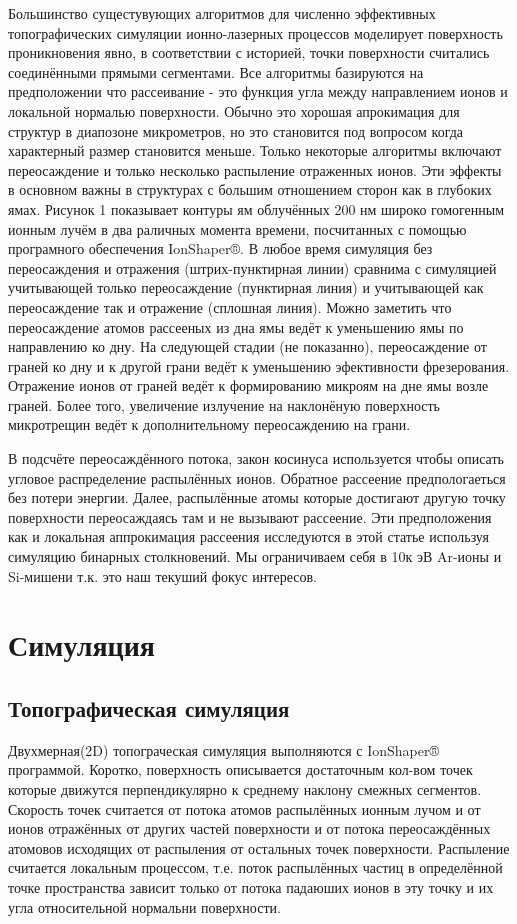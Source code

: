 \documentclass[a4paper,fontsize=12pt]{article}
\begin{document}
Большинство сущестувующих алгоритмов для численно эффективных топографических симуляции ионно-лазерных процессов моделирует поверхность проникновения явно, в соответствии с историей, точки поверхности считались соединёнными прямыми сегментами. Все алгоритмы базируются на предположении что рассеивание - это функция угла между направлением ионов и локальной нормалью поверхности. Обычно это хорошая апрокимация для структур в диапозоне микрометров, но это становится под вопросом когда характерный размер становится меньше. Только некоторые алгоритмы включают переосаждение и только несколько распыление отраженных ионов. Эти эффекты в основном важны в структурах с большим отношением сторон как в глубоких ямах. Рисунок 1 показывает контуры ям облучённых 200 нм широко гомогенным ионным лучём в два раличных момента времени, посчитанных с помощью програмного обеспечения IonShaper®. В любое время симуляция без переосаждения и отражения (штрих-пунктирная линии) сравнима с симуляцией учитывающей только переосаждение (пунктирная линия) и учитывающей как переосаждение так и отражение (сплошная линия). Можно заметить что переосаждение атомов рассееных из дна ямы ведёт к уменьшению ямы по направлению ко дну. На следующей стадии (не показанно), переосаждение от граней ко дну и к другой грани ведёт к уменьшению эфективности фрезерования. Отражение ионов от граней ведёт к формированию микроям на дне ямы возле граней. Более того, увеличение излучение на наклонёную поверхность микротрещин ведёт к дополнительному переосаждению на грани.

В подсчёте переосаждённого потока, закон косинуса используется чтобы описать угловое распределение распылённых ионов. Обратное рассеение предпологаеться без потери энергии. Далее, распылённые атомы которые достигают другую точку поверхности переосаждаясь там и не вызывают рассеение. Эти предположения как и локальная аппрокимация рассеения исследуются в этой статье используя симуляцию бинарных столкновений. Мы ограничиваем себя в 10к эВ Ar-ионы и Si-мишени т.к. это наш текуший фокус интересов.

\section{Симуляция}
\subsection{Топографическая симуляция}

Двухмерная(2D) топограческая симуляция выполняются с IonShaper® программой. Коротко, поверхность описывается достаточным кол-вом точек которые движутся перпендикулярно к среднему наклону смежных сегментов. Скорость точек считается от потока атомов распылённых ионным лучом и от ионов отражённых от других частей поверхности и от потока переосаждённых атомовов исходящих от распыления от остальных точек поверхности. Распыление считается локальным процессом, т.е. поток распылённых частиц в определённой точке пространства зависит только от потока падаюших ионов в эту точку и их угла относительной нормальни поверхности.
\end{document}
